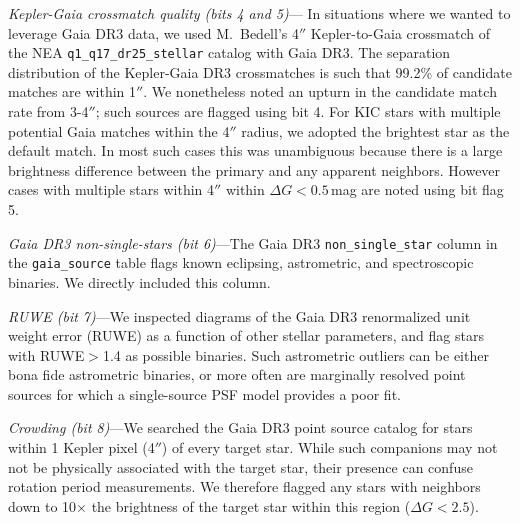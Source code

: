 \documentclass[11pt,twocolumn,tighten]{aastex63}
\begin{document}
{\it Kepler-Gaia crossmatch quality (bits 4 and 5)}--- In situations
where we wanted to leverage Gaia DR3 data, we used M.~Bedell's 4$''$
Kepler-to-Gaia crossmatch %
of the NEA
\texttt{q1\_q17\_dr25\_stellar} catalog with Gaia DR3.  The separation
distribution of the Kepler-Gaia DR3 crossmatches is such that 99.2\%
of candidate matches are within 1$''$.   We nonetheless noted an
upturn in the candidate match rate from 3-4$''$; such sources are
flagged using bit 4.  For KIC stars with multiple potential Gaia
matches within the 4$''$ radius, we adopted the brightest star
as the default match.  In most such cases this was unambiguous because
there is a large brightness difference between the primary and any
apparent neighbors.  However cases with multiple stars within 4$''$
within $\Delta G$$<$$0.5$\,mag are noted using bit flag 5.  

{\it Gaia DR3 non-single-stars (bit 6)}---The Gaia DR3
\texttt{non\_single\_star} column in the \texttt{gaia\_source} table
flags known eclipsing, astrometric, and spectroscopic binaries.  We
directly included this column.

{\it RUWE (bit 7)}---We inspected diagrams of the Gaia DR3 renormalized
unit weight error
(RUWE) as a function of other stellar parameters, %
and flag stars with RUWE$>$1.4 as possible binaries.  Such astrometric
outliers can be either bona fide astrometric binaries, or more often
are marginally resolved point sources for which a single-source PSF
model provides a poor fit.

{\it Crowding (bit 8)}---We searched the Gaia DR3 point source catalog
for stars within 1 Kepler pixel (4$''$) of every target star.  While
such companions may not not be physically associated with the target
star, their presence can confuse rotation period measurements.  We
therefore flagged any stars with neighbors down to 10$\times$ the
brightness of the target star within this region ($\Delta G < 2.5$).
\end{document}
